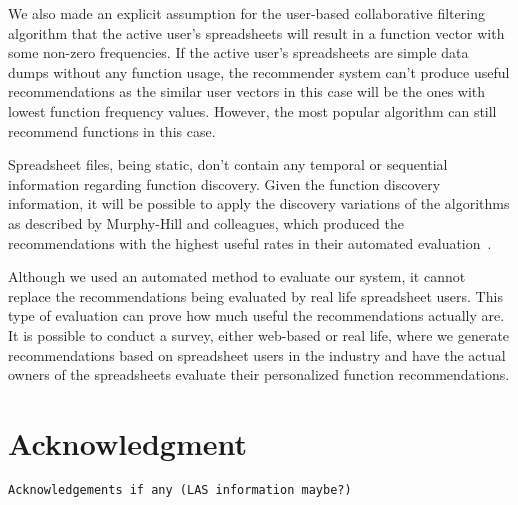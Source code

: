 \documentclass[conference]{IEEEtran}
\begin{document}
We also made an explicit assumption for the user-based collaborative filtering algorithm that the active user's spreadsheets will result in a function vector with some non-zero frequencies. If the active user's spreadsheets are simple data dumps without any function usage, the recommender system can't produce useful recommendations as the similar user vectors in this case will be the ones with lowest function frequency values. However, the most popular algorithm can still recommend functions in this case.

Spreadsheet files, being static, don't contain any temporal or sequential information regarding function discovery. Given the function discovery information, it will be possible to apply the discovery variations of the algorithms as described by Murphy-Hill and colleagues, which produced the recommendations with the highest useful rates in their automated evaluation~\cite{murphy2012improving}.

Although we used an automated method to evaluate our system, it cannot replace the recommendations being evaluated by real life spreadsheet users. This type of evaluation can prove how much useful the recommendations actually are. It is possible to conduct a survey, either web-based or real life, where we generate recommendations based on spreadsheet users in the industry and have the actual owners of the spreadsheets evaluate their personalized function recommendations.

\section*{Acknowledgment}
\texttt{Acknowledgements if any (LAS information maybe?)}






%





\end{document}
